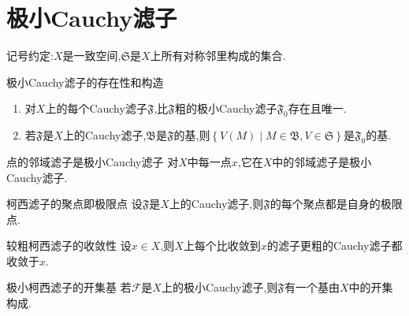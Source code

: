 \section{极小Cauchy滤子}

记号约定:$X$是一致空间,$\mathfrak{S}$是$X$上所有对称邻里构成的集合.

\begin{proposition}{极小Cauchy滤子的存在性和构造}{}
	\begin{enumerate}
		\item 对$X$上的每个Cauchy滤子$\mathfrak{F}$,比$\mathfrak{F}$粗的极小Cauchy滤子$\mathfrak{F}_{0}$存在且唯一.
		\item 若$\mathfrak{F}$是$X$上的Cauchy滤子,$\mathfrak{B}$是$\mathfrak{F}$的基,则$\left\{V\left(M\right)\middle|M\in\mathfrak{B},V\in\mathfrak{S}\right\}$是$\mathfrak{F}_{0}$的基.
	\end{enumerate}
\end{proposition}

\begin{corollary}{点的邻域滤子是极小Cauchy滤子}{}
	对$X$中每一点$x$,它在$X$中的邻域滤子是极小Cauchy滤子.
\end{corollary}

\begin{corollary}{柯西滤子的聚点即极限点}{}
	设$\mathfrak{F}$是$X$上的Cauchy滤子,则$\mathfrak{F}$的每个聚点都是自身的极限点.
\end{corollary}

\begin{corollary}{较粗柯西滤子的收敛性}{}
	设$x\in X$,则$X$上每个比收敛到$x$的滤子更粗的Cauchy滤子都收敛于$x$.
\end{corollary}

\begin{corollary}{极小柯西滤子的开集基}{}
	若$\mathcal{F}$是$X$上的极小Cauchy滤子,则$\mathfrak{F}$有一个基由$X$中的开集构成.
\end{corollary}